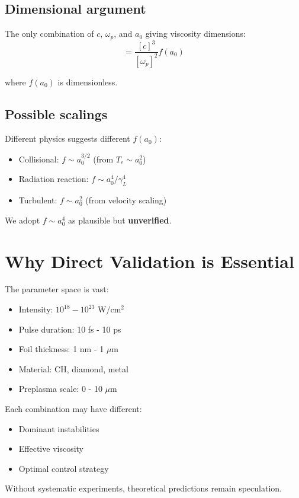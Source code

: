 \documentclass[aps,pre,twocolumn,showpacs,superscriptaddress]{revtex4-2}
\theoremstyle{definition}
\begin{document}
\subsection{Dimensional argument}

The only combination of $c$, $\omega_p$, and $a_0$ giving viscosity dimensions:
\begin{equation}
[\nu] = \frac{[c]^3}{[\omega_p]^2} f(a_0)
\end{equation}

where $f(a_0)$ is dimensionless.

\subsection{Possible scalings}

Different physics suggests different $f(a_0)$:
\begin{itemize}
\item Collisional: $f \sim a_0^{3/2}$ (from $T_e \sim a_0^2$)
\item Radiation reaction: $f \sim a_0^4/\gamma_L^4$
\item Turbulent: $f \sim a_0^2$ (from velocity scaling)
\end{itemize}

We adopt $f \sim a_0^4$ as plausible but \textbf{unverified}.

\section{Why Direct Validation is Essential}

The parameter space is vast:
\begin{itemize}
\item Intensity: $10^{18}-10^{23}$ W/cm$^2$
\item Pulse duration: 10 fs - 10 ps
\item Foil thickness: 1 nm - 1 $\mu$m
\item Material: CH, diamond, metal
\item Preplasma scale: 0 - 10 $\mu$m
\end{itemize}

Each combination may have different:
\begin{itemize}
\item Dominant instabilities
\item Effective viscosity
\item Optimal control strategy
\end{itemize}

Without systematic experiments, theoretical predictions remain speculation.


\end{document}
